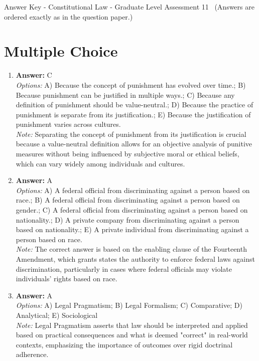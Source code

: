 \documentclass[12pt]{article}
\begin{document}
\begin{center}
Answer Key - Constitutional Law - Graduate Level Assessment 11 \
\small (Answers are ordered exactly as in the question paper.)
\end{center}

\section*{Multiple Choice}
\begin{enumerate}[label=\arabic*.]
\item \textbf{Answer:} C
\\ \textit{Options:} A) Because the concept of punishment has evolved over time.; B) Because punishment can be justified in multiple ways.; C) Because any definition of punishment should be value-neutral.; D) Because the practice of punishment is separate from its justification.; E) Because the justification of punishment varies across cultures.
\\ \textit{Note:} Separating the concept of punishment from its justification is crucial because a value-neutral definition allows for an objective analysis of punitive measures without being influenced by subjective moral or ethical beliefs, which can vary widely among individuals and cultures.
\item \textbf{Answer:} A
\\ \textit{Options:} A) A federal official from discriminating against a person based on race.; B) A federal official from discriminating against a person based on gender.; C) A federal official from discriminating against a person based on nationality.; D) A private company from discriminating against a person based on nationality.; E) A private individual from discriminating against a person based on race.
\\ \textit{Note:} The correct answer is based on the enabling clause of the Fourteenth Amendment, which grants states the authority to enforce federal laws against discrimination, particularly in cases where federal officials may violate individuals' rights based on race.
\item \textbf{Answer:} A
\\ \textit{Options:} A) Legal Pragmatism; B) Legal Formalism; C) Comparative; D) Analytical; E) Sociological
\\ \textit{Note:} Legal Pragmatism asserts that law should be interpreted and applied based on practical consequences and what is deemed "correct" in real-world contexts, emphasizing the importance of outcomes over rigid doctrinal adherence.

\end{enumerate}
\end{document}
